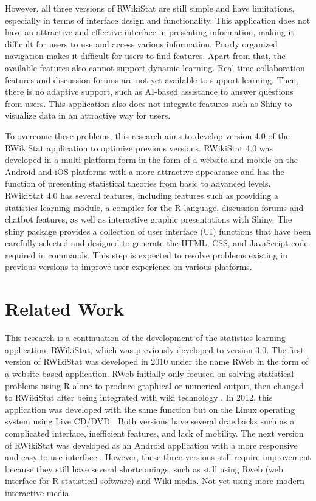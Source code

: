 \documentclass[conference,a4paper]{IEEEtran}
\begin{document}
However, all three versions of RWikiStat are still simple and have limitations,
especially in terms of interface design and functionality. This application
does not have an attractive and effective interface in presenting information,
making it difficult for users to use and access various information. Poorly
organized navigation makes it difficult for users to find features. Apart from
that, the available features also cannot support dynamic learning. Real time
collaboration features and discussion forums are not yet available to support
learning. Then, there is no adaptive support, such as AI-based assistance to
answer questions from users. This application also does not integrate features
such as Shiny to visualize data in an attractive way for users.

To overcome these problems, this research aims to develop version 4.0 of the
RWikiStat application to optimize previous versions. RWikiStat 4.0 was
developed in a multi-platform form in the form of a website and mobile on the
Android and iOS platforms with a more attractive appearance and has the
function of presenting statistical theories from basic to advanced levels.
RWikiStat 4.0 has several features, including features such as providing a
statistics learning module, a compiler for the R language, discussion forums
and chatbot features, as well as interactive graphic presentations with Shiny.
The shiny package provides a collection of user interface (UI) functions that
have been carefully selected and designed to generate the HTML, CSS, and
JavaScript code required in commands. This step is expected to resolve problems
existing in previous versions to improve user experience on various platforms.

\section{Related Work}
\label{sect:related_work}

This research is a continuation of the development of the statistics learning
application, RWikiStat, which was previously developed to version 3.0. The
first version of RWikiStat was developed in 2010 under the name RWeb in the
form of a website-based application. RWeb initially only focused on solving
statistical problems using R alone to produce graphical or numerical output,
then changed to RWikiStat after being integrated with wiki technology
\cite{b3}. In 2012, this application was developed with the same function but
on the Linux operating system using Live CD/DVD \cite{b4}. Both versions have
several drawbacks such as a complicated interface, inefficient features, and
lack of mobility. The next version of RWikiStat was developed as an Android
application with a more responsive and easy-to-use interface \cite{b5}.
However, these three versions still require improvement because they still have
several shortcomings, such as still using Rweb (web interface for R statistical
software) and Wiki media. Not yet using more modern interactive media.
\end{document}
